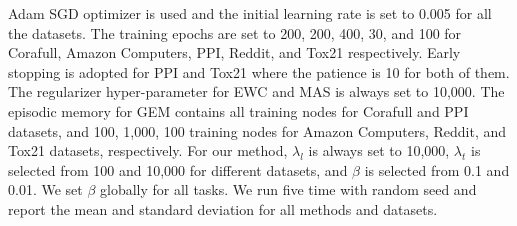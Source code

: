 \documentclass[letterpaper]{article} %
\begin{document}
Adam SGD optimizer is used and the initial learning rate 
is set to 0.005 for all the datasets.
The training epochs are set to 200, 200, 400, 30, and 100 for Corafull, Amazon Computers, PPI, Reddit, and Tox21 respectively.
Early stopping is adopted for PPI and Tox21 where
the patience is 10 for both of them.
The regularizer hyper-parameter for EWC and MAS is always set to 10,000. %
The episodic memory for GEM contains all training nodes for Corafull and PPI datasets, and 100, 1,000, 100 training nodes for Amazon Computers, Reddit, and Tox21 datasets, respectively.
For our method, $\lambda_l$ is always set to 10,000, $\lambda_t$ is selected from 100 and 10,000 for different datasets, and $\beta$ is selected from 0.1 and 0.01. 
We set $\beta$ globally for all tasks.
We run five time with random seed and report the mean
and standard deviation for all methods and datasets.
\end{document}
